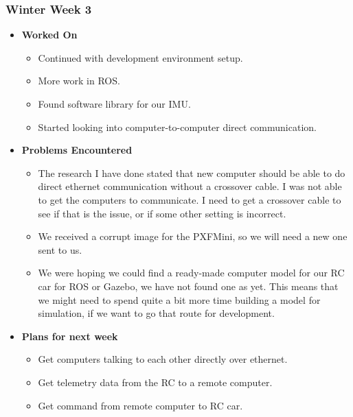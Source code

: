 \documentclass{article}
\begin{document}
\subsubsection{Winter Week 3}
\begin{itemize}
    \item {\textbf{Worked On}}
    \begin{itemize}
        \item Continued with development environment setup.
        \item More work in ROS.
        \item Found software library for our IMU.
        \item Started looking into computer-to-computer direct communication.
    \end{itemize}

    \item {\textbf{Problems Encountered}}
    \begin{itemize}
        \item The research I have done stated that new computer should be able to do direct ethernet communication without a crossover cable. I was not able to get the computers to communicate. I need to get a crossover cable to see if that is the issue, or if some other setting is incorrect.
        \item We received a corrupt image for the PXFMini, so we will need a new one sent to us.
        \item We were hoping we could find a ready-made computer model for our RC car for ROS or Gazebo, we have not found one as yet. This means that we might need to spend quite a bit more time building a model for simulation, if we want to go that route for development.
    \end{itemize}

    \item{\textbf{Plans for next week}}
    \begin{itemize}
        \item Get computers talking to each other directly over ethernet.
        \item Get telemetry data from the RC to a remote computer.
        \item Get command from remote computer to RC car.
    \end{itemize}
\end{itemize}
\end{document}
